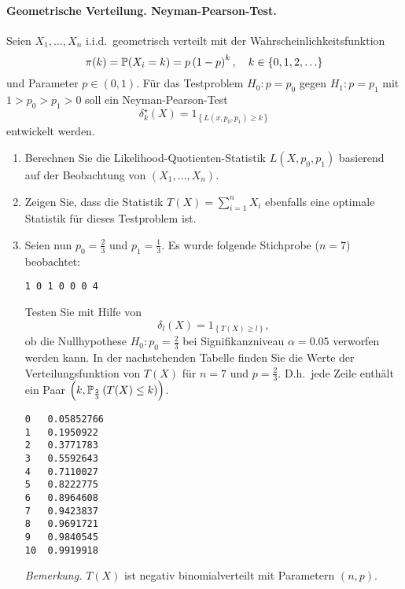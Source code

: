 \paragraph{Geometrische Verteilung. Neyman-Pearson-Test.} Seien $X_1,\ldots,X_n$ 
i.i.d.\ geometrisch verteilt mit der Wahrscheinlichkeitsfunktion
\begin{equation*}
    \pi(k) = \mathbb P(X_i = k) = p \left( 1-p \right)^k, \quad k\in\left\{ 0,1,2, \ldots \right\}
\end{equation*}
und Parameter $p\in \left( 0,1 \right)$.
Für das Testproblem $H_0 : p=p_0$ gegen $H_1 : p=p_1$ mit $1>p_0 > p_1 >0$ 
soll ein Neyman-Pearson-Test
\begin{equation*}
    \delta_k^\star (X) = 1_{ \left\{ L(x,p_0,p_1)\geq k \right\}  }
\end{equation*}
entwickelt werden.
\begin{enumerate}
    \item Berechnen Sie die Likelihood-Quotienten-Statistik $L(X,p_0,p_1)$ basierend auf der
        Beobachtung von $\left( X_1,\ldots,X_n \right)$.
    \item Zeigen Sie, dass die Statistik $T(X)= \sum_{i=1}^{n} X_i$ ebenfalls eine
        optimale Statistik für dieses Testproblem ist.
    \item Seien nun $p_0=\frac{2}{3}$ und $p_1=\frac{1}{3}$. Es wurde folgende Stichprobe ($n=7$) beobachtet:
        \begin{lstlisting}
1 0 1 0 0 0 4
        \end{lstlisting}   %
        Testen Sie mit Hilfe von 
        \begin{equation*}
            \delta_l(X) = 1_{   \left\{ T(X) \geq l \right\}},
        \end{equation*}
        ob die Nullhypothese $H_0 : p_0=\frac{2}{3}$ bei Signifikanzniveau $\alpha=0.05$
        verworfen werden kann. In der nachstehenden Tabelle finden Sie die Werte der Verteilungsfunktion
        von $T(X)$ für $n=7$ und $p=\frac{2}{3}$. D.h.\ jede Zeile enthält ein Paar 
        $\left( k, \mathbb P_{\frac{2}{3}} \left( T(X) \leq k \right) \right)$.
        \begin{lstlisting}
0   0.05852766
1   0.1950922
2   0.3771783
3   0.5592643
4   0.7110027
5   0.8222775
6   0.8964608
7   0.9423837
8   0.9691721
9   0.9840545
10  0.9919918
\end{lstlisting}   %
\emph{Bemerkung.} $T(X)$ ist negativ binomialverteilt mit Parametern $\left( n,p \right)$.
\end{enumerate}

